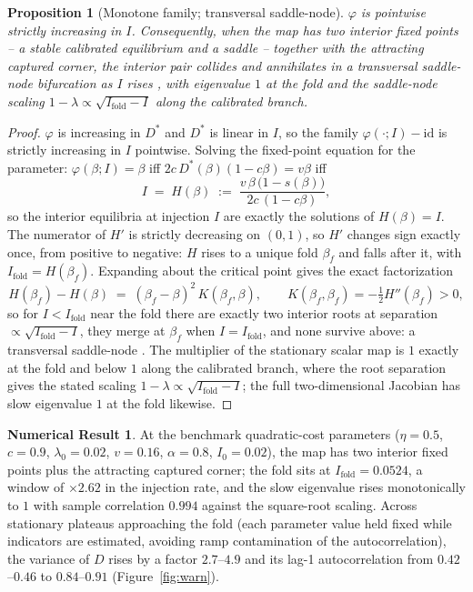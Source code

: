 \documentclass[11pt]{article}
\newtheorem{proposition}[theorem]{Proposition}
\theoremstyle{definition}
\newtheorem{numresult}[theorem]{Numerical Result}
\theoremstyle{remark}
\numberwithin{equation}{section}
\begin{document}
\begin{proposition}[Monotone family; transversal saddle-node]\label{prop:warning}
$\varphi$ is pointwise strictly increasing in $I$. Consequently, when the map has two interior fixed points -- a stable calibrated equilibrium and a saddle -- together with the attracting captured corner, the interior pair collides and annihilates in a transversal saddle-node bifurcation as $I$ rises \citep{kuznetsov2004elements}, with eigenvalue $1$ at the fold and the saddle-node scaling $1 - \lambda \propto \sqrt{I_{\mathrm{fold}} - I}$ along the calibrated branch.
\end{proposition}
\begin{proof}
$\varphi$ is increasing in $D^\ast$ and $D^\ast$ is linear in $I$, so the family $\varphi(\cdot; I) - \mathrm{id}$ is strictly increasing in $I$ pointwise. Solving the fixed-point equation for the parameter: $\varphi(\beta; I) = \beta$ iff $2c\,D^\ast(\beta)(1-c\beta) = v\beta$ iff
\[
I \;=\; H(\beta) \;:=\; \frac{v\,\beta\,\bigl(1-s(\beta)\bigr)}{2c\,(1-c\beta)} ,
\]
so the interior equilibria at injection $I$ are exactly the solutions of $H(\beta) = I$. The numerator of $H'$ is strictly decreasing on $(0,1)$, so $H'$ changes sign exactly once, from positive to negative: $H$ rises to a unique fold $\beta_f$ and falls after it, with $I_{\mathrm{fold}} = H(\beta_f)$. Expanding about the critical point gives the exact factorization
\[
H(\beta_f) - H(\beta) \;=\; (\beta_f - \beta)^2\,K(\beta_f, \beta), \qquad K(\beta_f, \beta_f) = -\tfrac12 H''(\beta_f) > 0 ,
\]
so for $I < I_{\mathrm{fold}}$ near the fold there are exactly two interior roots at separation $\propto \sqrt{I_{\mathrm{fold}} - I}$, they merge at $\beta_f$ when $I = I_{\mathrm{fold}}$, and none survive above: a transversal saddle-node \citep{kuznetsov2004elements}. The multiplier of the stationary scalar map is $1$ exactly at the fold and below $1$ along the calibrated branch, where the root separation gives the stated scaling $1 - \lambda \propto \sqrt{I_{\mathrm{fold}} - I}$; the full two-dimensional Jacobian has slow eigenvalue $1$ at the fold likewise.
\end{proof}

\begin{numresult}\label{nr:warn}
At the benchmark quadratic-cost parameters ($\eta = 0.5$, $c = 0.9$, $\lambda_0 = 0.02$, $v = 0.16$, $\alpha = 0.8$, $I_0 = 0.02$), the map has two interior fixed points plus the attracting captured corner; the fold sits at $I_{\mathrm{fold}} = 0.0524$, a window of $\times 2.62$ in the injection rate, and the slow eigenvalue rises monotonically to $1$ with sample correlation $0.994$ against the square-root scaling. Across stationary plateaus approaching the fold (each parameter value held fixed while indicators are estimated, avoiding ramp contamination of the autocorrelation), the variance of $D$ rises by a factor $2.7$--$4.9$ and its lag-1 autocorrelation from $0.42$--$0.46$ to $0.84$--$0.91$ (Figure~\ref{fig:warn}).
\end{numresult}
\end{document}
